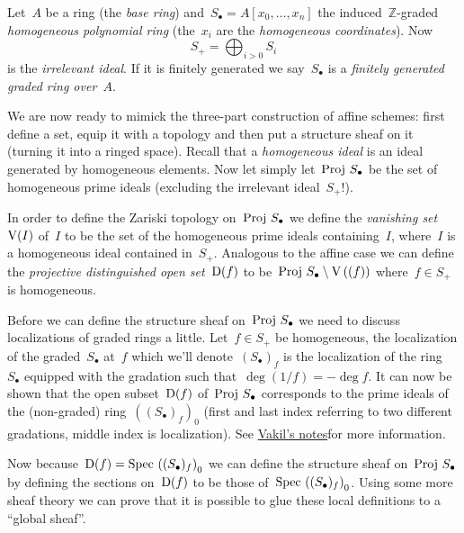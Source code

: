 \begin{example}
  Let~$A$ be a ring (the \emph{base ring}) and~$S_\bullet=A[x_0,\ldots,x_n]$ the induced~$\mathbb{Z}$-graded \emph{homogeneous polynomial ring} (the~$x_i$ are the \emph{homogeneous coordinates}). Now
  \begin{equation}
    S_+=\bigoplus_{i>0}S_i
  \end{equation}
  is the \emph{irrelevant ideal}. If it is finitely generated we say~$S_\bullet$ is a \emph{finitely generated graded ring over~$A$}.
\end{example}

We are now ready to mimick the three-part construction of affine schemes: first define a set, equip it with a topology and then put a structure sheaf on it (turning it into a ringed space). Recall that a \emph{homogeneous ideal} is an ideal generated by homogeneous elements. Now let simply let~$\operatorname{Proj\,} S_\bullet$ be the set of homogeneous prime ideals (excluding the irrelevant ideal~$S_+$!).

In order to define the Zariski topology on~$\operatorname{Proj\,} S_\bullet$ we define the \emph{vanishing set~$\operatorname{V}(I)$} of~$I$ to be the set of the homogeneous prime ideals containing~$I$, where~$I$ is a homogeneous ideal contained in~$S_+$. Analogous to the affine case we can define the \emph{projective distinguished open set}~$\operatorname{D}(f)$ to be~$\operatorname{Proj\,} S_\bullet\setminus\operatorname{V}\left( (f) \right)$ where~$f\in S_+$ is homogeneous.

Before we can define the structure sheaf on~$\operatorname{Proj\,} S_\bullet$ we need to discuss localizations of graded rings a little. Let~$f\in S_+$ be homogeneous, the localization of the graded~$S_\bullet$ at~$f$ which we'll denote~$(S_\bullet)_f$ is the localization of the ring~$S_\bullet$ equipped with the gradation such that~$\deg(1/f)=-\deg f$. It can now be shown that the open subset~$\operatorname{D}(f)$ of~$\operatorname{Proj\,} S_\bullet$ corresponds to the prime ideals of the (non-graded) ring~$\left( (S_\bullet)_f \right)_0$ (first and last index referring to two different gradations, middle index is localization). See \iftex\cite{foag}\fi\ifblog\href{http://math216.wordpress.com}{Vakil's notes}\fi for more information.

Now because~$\operatorname{D}(f)=\operatorname{Spec\,}\left( (S_\bullet)_f \right)_0$ we can define the structure sheaf on~$\operatorname{Proj\,} S_\bullet$ by defining the sections on~$\operatorname{D}(f)$ to be those of~$\operatorname{Spec\,}\left( (S_\bullet)_f \right)_0$. Using some more sheaf theory we can prove that it is possible to glue these local definitions to a ``global sheaf''.

